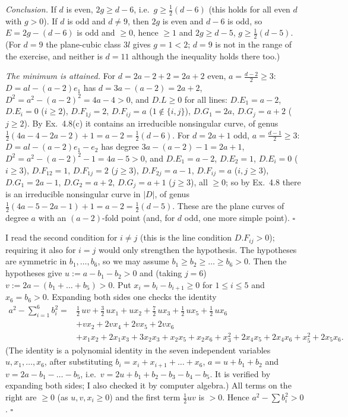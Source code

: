 \documentclass[11pt]{article}
\begin{document}
\emph{Conclusion.} If $d$ is even, $2g\ge d-6$, i.e.\ $g\ge\frac12(d-6)$ (this holds for all even $d$ with $g>0$). If $d$ is odd and $d\ne9$, then $2g$ is even and $d-6$ is odd, so $E=2g-(d-6)$ is odd and $\ge0$, hence $\ge1$ and $2g\ge d-5$, $g\ge\frac12(d-5)$. (For $d=9$ the plane-cubic class $3l$ gives $g=1<2$; $d=9$ is not in the range of the exercise, and neither is $d=11$ although the inequality holds there too.)

\emph{The minimum is attained.} For $d=2a-2+2=2a+2$ even, $a=\frac{d-2}2\ge3$: $D=al-(a-2)e_1$ has $d=3a-(a-2)=2a+2$, $D^2=a^2-(a-2)^2=4a-4>0$, and $D.L\ge0$ for all lines: $D.E_1=a-2$, $D.E_i=0$ ($i\ge2$), $D.F_{1j}=2$, $D.F_{ij}=a$ ($1\notin\{i,j\}$), $D.G_1=2a$, $D.G_j=a+2$ ($j\ge2$). By Ex.~4.8(c) it contains an irreducible nonsingular curve, of genus $\frac12(4a-4-2a-2)+1=a-2=\frac12(d-6)$. For $d=2a+1$ odd, $a=\frac{d-1}2\ge3$: $D=al-(a-2)e_1-e_2$ has degree $3a-(a-2)-1=2a+1$, $D^2=a^2-(a-2)^2-1=4a-5>0$, and $D.E_1=a-2$, $D.E_2=1$, $D.E_i=0$ ($i\ge3$), $D.F_{12}=1$, $D.F_{1j}=2$ ($j\ge3$), $D.F_{2j}=a-1$, $D.F_{ij}=a$ ($i,j\ge3$), $D.G_1=2a-1$, $D.G_2=a+2$, $D.G_j=a+1$ ($j\ge3$), all $\ge0$; so by Ex.~4.8 there is an irreducible nonsingular curve in $|D|$, of genus $\frac12(4a-5-2a-1)+1=a-2=\frac12(d-5)$. These are the plane curves of degree $a$ with an $(a-2)$-fold point (and, for $d$ odd, one more simple point). \hfill$\square$

\pf
I read the second condition for $i\ne j$ (this is the line condition $D.F_{ij}>0$); requiring it also for $i=j$ would only strengthen the hypothesis. The hypotheses are symmetric in $b_1,\dots,b_6$, so we may assume $b_1\ge b_2\ge\dots\ge b_6>0$. Then the hypotheses give $u:=a-b_1-b_2>0$ and (taking $j=6$) $v:=2a-(b_1+\dots+b_5)>0$. Put $x_i=b_i-b_{i+1}\ge0$ for $1\le i\le5$ and $x_6=b_6>0$. Expanding both sides one checks the identity
\[
\begin{aligned}
a^2-\sum_{i=1}^6b_i^2={}&\tfrac12\,uv+\tfrac32\,ux_1+ux_2+\tfrac72\,ux_3+\tfrac12\,ux_5+\tfrac12\,ux_6\\
&+vx_2+2vx_4+2vx_5+2vx_6\\
&+x_1x_2+2x_1x_3+3x_2x_3+x_2x_5+x_2x_6+x_3^2+2x_4x_5+2x_4x_6+x_5^2+2x_5x_6 .
\end{aligned}
\]
(The identity is a polynomial identity in the seven independent variables $u,x_1,\dots,x_6$, after substituting $b_i=x_i+x_{i+1}+\dots+x_6$, $a=u+b_1+b_2$ and $v=2a-b_1-\dots-b_5$, i.e.\ $v=2u+b_1+b_2-b_3-b_4-b_5$. It is verified by expanding both sides; I also checked it by computer algebra.) All terms on the right are $\ge0$ (as $u,v,x_i\ge0$) and the first term $\frac12uv$ is $>0$. Hence $a^2-\sum b_i^2>0$. \hfill$\square$
\end{document}
